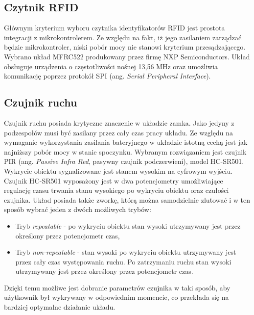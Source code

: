         \subsection{Czytnik RFID}

            Głównym kryterium wyboru czytnika identyfikatorów RFID jest prostota integracji z mikrokontrolerem. Ze względu na fakt, iż jego zasilaniem zarządzać będzie mikrokontroler, niski pobór mocy nie stanowi kryterium przesądzającego. Wybrano układ MFRC522 produkowany przez firmę NXP Semiconductors. Układ obsługuje urządzenia o częstotliwości nośnej 13,56 MHz oraz umożliwia komunikację poprzez protokół SPI (ang. \textit{Serial Peripheral Interface}).

        \subsection{Czujnik ruchu}

            Czujnik ruchu posiada krytyczne znaczenie w układzie zamka. Jako jedyny z podzespołów musi być zasilany przez cały czas pracy układu. Ze względu na wymaganie wykorzystania zasilania bateryjnego w układzie istotną cechą jest jak najniższy pobór mocy w stanie spoczynku. Wybranym rozwiązaniem jest czujnik PIR (ang. \textit{Passive Infra Red}, pasywny czujnik podczerwieni), model HC-SR501. Wykrycie obiektu sygnalizowane jest stanem wysokim na cyfrowym wyjściu. Czujnik HC-SR501 wyposażony jest w dwa potencjometry umożliwiające regulację czasu trwania stanu wysokiego po wykryciu obiektu oraz czułości czujnika. Układ posiada także zworkę, którą można samodzielnie zlutować i w ten sposób wybrać jeden z dwóch możliwych trybów:

            \begin{itemize}
                \item Tryb \textit{repeatable} - po wykryciu obiektu stan wysoki utrzymywany jest przez określony przez potencjometr czas,
                \item Tryb \textit{non-repeatable} - stan wysoki po wykryciu obiektu utrzymywany jest przez cały czas występowania ruchu. Po zatrzymaniu ruchu stan wysoki utrzymywany jest przez określony przez potencjometr czas.
            \end{itemize}

            Dzięki temu możliwe jest dobranie parametrów czujnika w taki sposób, aby użytkownik był wykrywany w odpowiednim momencie, co przekłada się na bardziej optymalne działanie układu.

